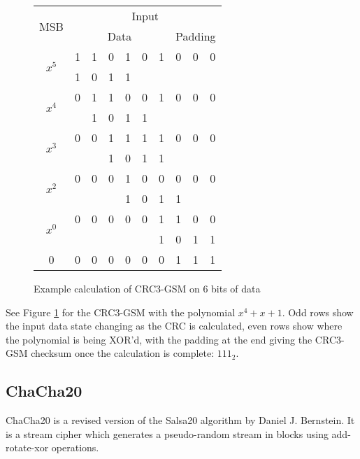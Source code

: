 \documentclass{report}
\begin{document}
\begin{figure}[H]
\begin{center}
  \begin{tabular}{| c | c c c c c c c c c |}
    \hline
    \multirow{2}{*}{MSB} & \multicolumn{9}{c|}{Input} \\
    \cline{2-10}
     & \multicolumn{6}{c}{Data} & \multicolumn{3}{|c|}{Padding} \\
    \hline
    \multirow{2}{*}{$x^{5}$}
    &1&1&0&1&0&1&\multicolumn{1}{|c}{0}&0&0\\
    \cline{2-10}
    &1&0&1&1& & & & & \\
    \hline
    \multirow{2}{*}{$x^{4}$}
    &0&1&1&0&0&1&\multicolumn{1}{|c}{0}&0&0\\
    \cline{2-10}
    & &1&0&1&1& & & & \\
    \hline
    \multirow{2}{*}{$x^{3}$}
    &0&0&1&1&1&1&\multicolumn{1}{|c}{0}&0&0\\
    \cline{2-10}
    & & &1&0&1&1& & & \\
    \hline
    \multirow{2}{*}{$x^{2}$}
    &0&0&0&1&0&0&\multicolumn{1}{|c}{0}&0&0\\
    \cline{2-10}
    & & & &1&0&1&1& & \\
    \hline
    \multirow{2}{*}{$x^{0}$}
    &0&0&0&0&0&1&\multicolumn{1}{|c}{1}&0&0\\
    \cline{2-10}
    & & & & & &1&0&1&1\\
    \hline
    0
    &0&0&0&0&0&0&\multicolumn{1}{|c}{1}&1&1\\
   \hline
  \end{tabular}
  \caption{Example calculation of CRC3-GSM on 6 bits of data}
  \label{table:crc3}
\end{center}
\end{figure}

See Figure \ref{table:crc3} for the CRC3-GSM with the polynomial $x^{4}+x+1$. Odd rows show the input data state changing as the CRC is calculated, even rows show where the polynomial is being XOR'd, with the padding at the end giving the CRC3-GSM checksum once the calculation is complete: $111_2$.

\subsection{ChaCha20}

ChaCha20 is a revised version of the Salsa20 algorithm \cite{salsa20} by Daniel J. Bernstein. It is a stream cipher which generates a pseudo-random stream in blocks using add-rotate-xor operations.
\end{document}
